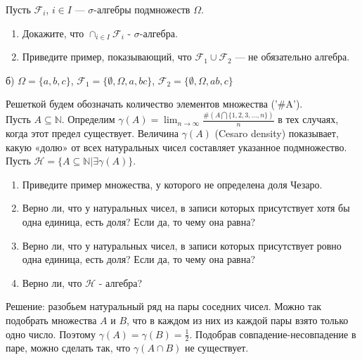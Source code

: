 \begin{problem}
Пусть $\mathcal{F}_{i}$, $i\in I$ — $\sigma$-алгебры подмножеств
$\Omega$. \\
\begin{enumerate}
\item Докажите, что $\cap_{i\in I}\mathcal{F}_{i}$ -
$\sigma$-алгебра. \\
\item Приведите пример, показывающий, что
$\mathcal{F}_{1}\cup\mathcal{F}_{2}$ — не обязательно алгебра.
\end{enumerate}

\begin{sol}
 б) $\Omega=\{a,b,c\}$, $\mathcal{F}_{1}=\{\emptyset,\Omega,a,bc\}$, $\mathcal{F}_{2}=\{\emptyset,\Omega,ab,c\}$
\end{sol}
\end{problem}

\begin{problem}
Решеткой будем обозначать количество элементов множества ('\#A').\\
Пусть $A \subseteq \mathbb{N}$. Определим
$\gamma(A)=\lim_{n\rightarrow \infty}\frac{\#(A\bigcap
\{1,2,3,\ldots,n\})}{n}$ в тех случаях, когда этот предел существует.
Величина $\gamma(A)$ (Cesaro density) показывает, какую «долю» от
всех натуральных чисел составляет указанное подмножество. Пусть
$\mathcal{H}=\{A\subseteq \mathbb{N}|\exists \gamma(A)\}$.

\begin{enumerate}
\item Приведите пример множества, у которого не определена доля Чезаро.
\item Верно ли, что у натуральных чисел, в записи которых присутствует
хотя бы одна единица, есть доля? Если да, то чему она равна?
\item Верно ли, что у натуральных чисел, в записи которых присутствует
ровно одна единица, есть доля? Если да, то чему она равна?
\item Верно
ли, что $\mathcal{H}$ -
алгебра?
\end{enumerate}


\begin{sol}

Решение: разобьем натуральный ряд на пары соседних чисел. Можно
так подобрать множества $A$ и $B$, что в каждом из них из каждой
пары взято только одно число. Поэтому
$\gamma(A)=\gamma(B)=\frac{1}{2}$. Подобрав
совпадение-несовпадение в паре, можно сделать так, что
$\gamma(A\cap B)$ не существует.
\end{sol}
\end{problem}

